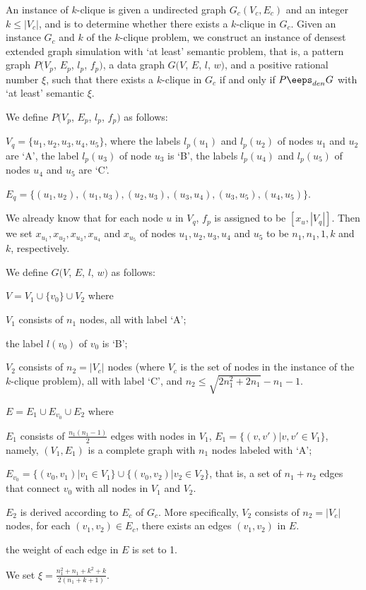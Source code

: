 An instance of $k$-clique is given a undirected graph $G_c(V_c,E_c)$ and an integer $k \leq |V_c|$, and is to determine whether there exists a $k$-clique in $G_c$. Given an instance $G_c$ and $k$ of the $k$-clique problem, we construct an instance of densest extended graph simulation with `at least' semantic problem, that is, a pattern graph $P(V_p$, $E_p$, $l_p$, $f_p)$, a data graph $G(V$, $E$, $l$, $w)$, and a positive rational number $\xi$, such that there exists a $k$-clique in $G_c$ if and only if $P \eeps_{den} G$ with `at least' semantic \wrt $\xi$.
\be
\item We define $P(V_p$, $E_p$, $l_p$, $f_p)$ as follows:
\bi
\item [(1)] $V_q = \{u_1,u_2,u_3,u_4,u_5\}$, where the labels $l_p(u_1)$ and $l_p(u_2)$ of nodes $u_1$ and $u_2$ are `A', the label $l_p(u_3)$ of node $u_3$ is `B', the labels $l_p(u_4)$ and $l_p(u_5)$ of nodes $u_4$ and $u_5$ are `C'.
\item [(2)] $E_q = \{(u_1, u_2), (u_1, u_3), (u_2, u_3), (u_3, u_4), (u_3, u_5), (u_4, u_5)\}$.
\item [(3)] We already know that for each node $u$ in $V_q$, $f_p$ is assigned to be $[x_u, |V_q|]$. Then we set $x_{u_1}, x_{u_2},x_{u_3},x_{u_4}$ and $x_{u_5}$ of nodes $u_1, u_2, u_3, u_4$ and $u_5$ to be $n_1, n_1, 1, k$ and $k$, respectively.
\ei
\item We define $G(V$, $E$, $l$, $w)$ as follows:
\bi
\item [(1)] $V = V_1 \cup \{v_0\} \cup V_2$ where
\bi
\item [(a)] $V_1$ consists of $n_1$ nodes, all with label `A';
\item [(b)] the label $l(v_0)$ of $v_0$ is `B';
\item [(c)] $V_2$ consists of $n_2=|V_c|$ nodes (where $V_c$ is the set of nodes in the instance of the $k$-clique problem), all with label `C', and $n_2\leq\sqrt{2n_1^2+2n_1}-n_1-1$.
\ei
\item [(2)] $E = E_1 \cup E_{v_0} \cup E_2$ where
\bi
\item [(a)] $E_1$ consists of $\frac{n_1(n_1-1)}{2}$ edges with nodes in $V_1$, $E_1=\{(v,v')|v,v'\in V_1\}$, namely, $(V_1,E_1)$ is a complete graph with $n_1$ nodes labeled with `A';
\item [(b)] $E_{v_0}=\{(v_0,v_1)|v_1\in V_1\}\cup\{(v_0,v_2)|v_2\in V_2\}$, that is, a set of $n_1+n_2$ edges that connect $v_0$ with all nodes in $V_1$ and $V_2$.
\item [(c)] $E_2$ is derived according to $E_c$ of $G_c$. More specifically, $V_2$ consists of $n_2=|V_c|$ nodes, for each $(v_1, v_2)\in E_c$, there exists an edges $(v_1, v_2)$ in $E$.
\item [(d)] the weight of each edge in $E$ is set to 1.
\ei
\item [(3)] We set $\xi=\frac{n_1^2+n_1+k^2+k}{2(n_1+k+1)}$.
\ei
\ee

